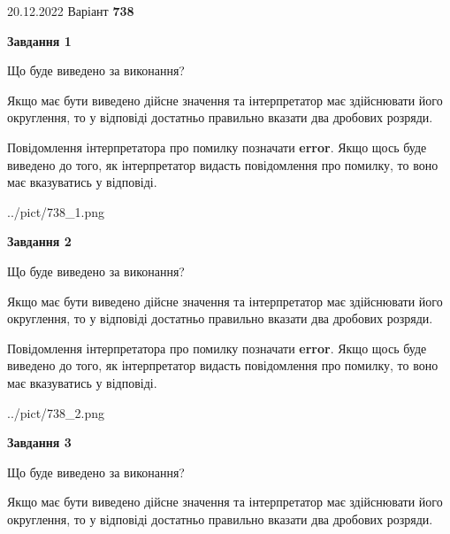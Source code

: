 \documentclass[12pt, ukrainian]{article}
\begin{document}
{20.12.2022 Варіант \No \textbf { 738 }\par}
{
\begin {Large}

{\begin {center}\textbf{Завдання 1}\end {center}}\par
Що буде виведено за виконання? \par

Якщо має бути виведено дійсне значення та інтерпретатор має здійснювати його округлення, 
то у відповіді достатньо правильно вказати два дробових розряди.

Повідомлення інтерпретатора про помилку позначати \textbf{error}.
Якщо щось буде виведено до того, як інтерпретатор видасть повідомлення про помилку, 
то воно має вказуватись у відповіді. \par

\begin{center}
	{../pict/738_1.png}
\end{center}
\newpage

{\begin {center}\textbf{Завдання 2}\end {center}}\par
Що буде виведено за виконання? \par

Якщо має бути виведено дійсне значення та інтерпретатор має здійснювати його округлення, 
то у відповіді достатньо правильно вказати два дробових розряди.

Повідомлення інтерпретатора про помилку позначати \textbf{error}.
Якщо щось буде виведено до того, як інтерпретатор видасть повідомлення про помилку, 
то воно має вказуватись у відповіді. \par

\begin{center}
	{../pict/738_2.png}
\end{center}
\newpage

{\begin {center}\textbf{Завдання 3}\end {center}}\par
Що буде виведено за виконання? \par

Якщо має бути виведено дійсне значення та інтерпретатор має здійснювати його округлення, 
то у відповіді достатньо правильно вказати два дробових розряди.


\end{Large}}
\end{document}
